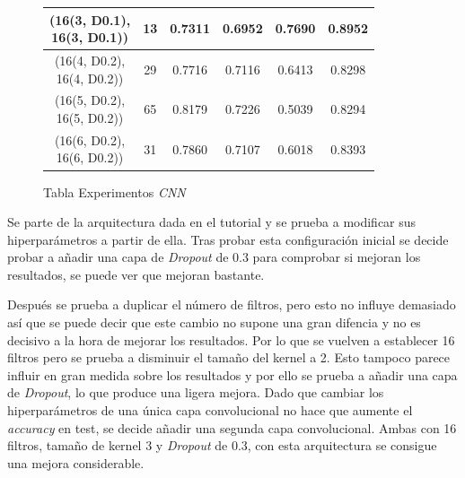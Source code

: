 \documentclass{uc3mpracticas}
\begin{document}
\begin{figure}[!h]
\begin{center}
\begin{tabular}{|c|c|c|c|c|c|}
        \makecell{(16(3, D0.1), \\ 16(3, D0.1))} & 13   &  0.7311                                  &  0.6952                         &  0.7690                              &  0.8952            \\ \hline
        \makecell{(16(4, D0.2), \\ 16(4, D0.2))} & 29   &  0.7716                                  &  0.7116                         &  0.6413                              &  0.8298            \\ \hline
        \rowcolor{LightGreen}
        \makecell{(16(5, D0.2), \\ 16(5, D0.2))}& 65   &  0.8179                                  &  0.7226                         &  0.5039                              &  0.8294            \\ \hline
        \makecell{(16(6, D0.2), \\ 16(6, D0.2))} & 31   &  0.7860                                  &  0.7107                         &  0.6018                              &  0.8393            \\ \hline
  \end{tabular}
\end{center}
\caption*{Tabla Experimentos \textit{CNN}}
\end{figure}

\newpage

Se parte de la arquitectura dada en el tutorial y se prueba a modificar sus hiperparámetros a partir de ella. Tras probar esta configuración inicial se decide probar a añadir una capa de \textit{Dropout} de 0.3 para comprobar si mejoran los resultados, se puede ver que mejoran bastante.

\vspace{2mm}

Después se prueba a duplicar el número de filtros, pero esto no influye demasiado así que se puede decir que este cambio no supone una gran difencia y no es decisivo a la hora de mejorar los resultados. Por lo que se vuelven a establecer 16 filtros pero se prueba a disminuir el tamaño del kernel a 2. Esto tampoco parece influir en gran medida sobre los resultados y por ello se prueba a añadir una capa de \textit{Dropout}, lo que produce una ligera mejora. Dado que cambiar los hiperparámetros de una única capa convolucional no hace que aumente el \textit{accuracy} en test, se decide añadir una segunda capa convolucional. Ambas con 16 filtros, tamaño de kernel 3 y \textit{Dropout} de 0.3, con esta arquitectura se consigue una mejora considerable.
\end{document}

